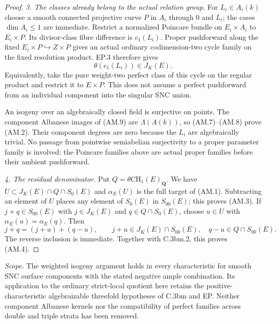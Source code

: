 \begin{proof}
\emph{3. The classes already belong to the actual relation group.}
For $L_i\in A_i(k)$ choose a smooth connected projective curve
$P$ in $A_i$ through $0$ and $L_i$; the cases $\dim A_i\le1$
are immediate. Restrict a normalized Poincare bundle on
$E_i\times A_i$ to $E_i\times P$. Its divisor-class fibre
difference is $c_1(L_i)$. Proper pushforward along the fixed
$E_i\times P\hookrightarrow Z\times P$ gives an actual ordinary
codimension-two cycle family on the fixed resolution product.
EP.3 therefore gives
\begin{equation}
                           \theta(c_1(L_i))\in J_K(E). \tag{AM.9}
\end{equation}
Equivalently, take the pure weight-two perfect class of this
cycle on the regular product and restrict it to $E\times P$.
This does not assume a perfect pushforward from an individual
component into the singular SNC union.

An isogeny over an algebraically closed field is surjective on
points. The component Albanese images of (AM.9) are
$\Lambda(A(k))$, so (AM.7)--(AM.8) prove (AM.2). Their component
degrees are zero because the $L_i$ are algebraically trivial.
No passage from pointwise semiabelian surjectivity to a proper
parameter family is involved: the Poincare families above
are actual proper families before their ambient pushforward.

\emph{4. The residual denominator.}
Put $Q=\theta\mathrm{CH}_1(E)_{\mathbf Q}$.
We have $U\subset J_K(E)\cap Q\cap S_0(E)$ and $\alpha_E(U)$
is the full target of (AM.1). Subtracting an element of $U$
places any element of $S_0(E)$ in $S_{00}(E)$; this proves
(AM.3). If $j+q\in S_{00}(E)$ with $j\in J_K(E)$ and
$q\in Q\cap S_0(E)$, choose $u\in U$ with
$\alpha_E(u)=\alpha_E(q)$. Then
\[
 j+q=(j+u)+(q-u),\qquad
 j+u\in J_K(E)\cap S_{00}(E),\quad q-u\in Q\cap S_{00}(E).
\]
The reverse inclusion is immediate. Together with C.3bm.2,
this proves (AM.4).
\end{proof}

\emph{Scope.}
The weighted isogeny argument holds in every characteristic for
smooth SNC surface components with the stated negative ample
combination. Its application to the ordinary strict-local
quotient here retains the positive-characteristic algebraizable
threefold hypotheses of C.3bm and EP. Neither component
Albanese kernels nor the compatibility of perfect families
across double and triple strata has been removed.


